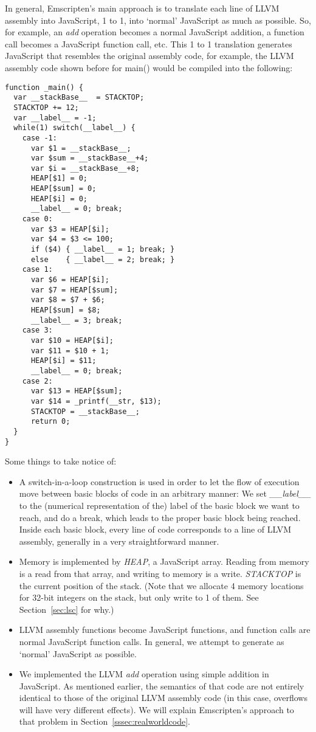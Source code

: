 \documentclass[preprint,10pt]{sigplanconf}
\begin{document}
In general, Emscripten's main approach is to translate each line of LLVM
assembly into JavaScript, 1 to 1, into `normal' JavaScript
as much as possible. So, for example, an \emph{add} operation becomes
a normal JavaScript addition, a function call becomes a JavaScript
function call, etc. This 1 to 1 translation generates JavaScript
that resembles the original assembly code, for example, the LLVM assembly code shown
before for main() would be compiled into the following:
\label{code:example}
\begin{verbatim}
function _main() {
  var __stackBase__  = STACKTOP;
  STACKTOP += 12;
  var __label__ = -1;
  while(1) switch(__label__) {
    case -1:
      var $1 = __stackBase__;
      var $sum = __stackBase__+4;
      var $i = __stackBase__+8;
      HEAP[$1] = 0;
      HEAP[$sum] = 0;
      HEAP[$i] = 0;
      __label__ = 0; break;
    case 0:
      var $3 = HEAP[$i];
      var $4 = $3 <= 100;
      if ($4) { __label__ = 1; break; }
      else    { __label__ = 2; break; }
    case 1:
      var $6 = HEAP[$i];
      var $7 = HEAP[$sum];
      var $8 = $7 + $6;
      HEAP[$sum] = $8;
      __label__ = 3; break;
    case 3:
      var $10 = HEAP[$i];
      var $11 = $10 + 1;
      HEAP[$i] = $11;
      __label__ = 0; break;
    case 2:
      var $13 = HEAP[$sum];
      var $14 = _printf(__str, $13);
      STACKTOP = __stackBase__;
      return 0;
  }
}
\end{verbatim}
Some things
to take notice of:
\begin{itemize}
\item A switch-in-a-loop construction is used in order to let the flow
      of execution move between basic blocks of code in an arbitrary manner: We set
      \emph{\_\_label\_\_} to the (numerical representation of the) label of
      the basic block we want to reach, and do a break, which leads to the proper
      basic block being reached. Inside each basic block, every line of code corresponds to a line of
      LLVM assembly, generally in a very straightforward manner. 
\item Memory is implemented by \emph{HEAP}, a JavaScript array. Reading from
      memory is a read from that array, and writing to memory is a write.
      \emph{STACKTOP} is the current position of the stack. (Note that we
      allocate 4 memory locations for 32-bit integers on the stack, but only 
      write to 1 of them. See Section~\ref{sec:lsc} for why.)
\item LLVM assembly functions become JavaScript functions, and function calls
      are normal JavaScript function calls. In general, we attempt to generate
      as `normal' JavaScript as possible.
\item We implemented the LLVM \emph{add} operation using simple addition in JavaScript.
      As mentioned earlier, the semantics of that code are not entirely identical to
      those of the original LLVM assembly code (in this case, overflows will have very
      different effects). We will explain Emscripten's approach to that problem in
      Section~\ref{sssec:realworldcode}.
\end{itemize}
\end{document}
